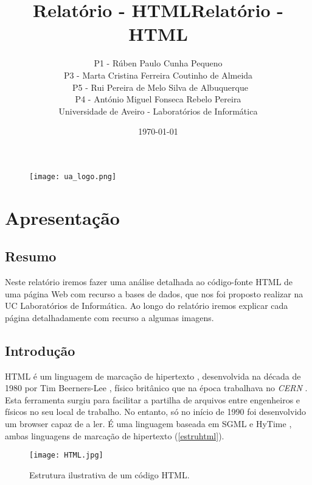 \documentclass[11pt,openright,twoside]{report}
\title{\textbf{Relatório - HTML}}
\begin{document}
\begin{titlepage}
\begin{figure}
\title{\textbf{Relatório - HTML}}
\author{P1 - Rúben Paulo Cunha Pequeno\\
P3 - Marta Cristina Ferreira Coutinho de Almeida\\\
P5 - Rui Pereira de Melo Silva de Albuquerque\\
P4 - António Miguel Fonseca Rebelo Pereira\\\vspace{3cm}
Universidade de Aveiro - Laboratórios de Informática}
\date{\today}
 \texttt{[image: ua\_logo.png]}
\end{figure}
\end{titlepage}

\maketitle
\tableofcontents
\listoffigures

\part{Apresentação}

\chapter{Resumo}
Neste relatório iremos fazer uma análise detalhada ao código-fonte HTML de uma página Web com recurso a bases de dados, que nos foi proposto realizar na UC Laboratórios de Informática. Ao longo do relatório iremos explicar cada página detalhadamente com recurso a algumas imagens.
\smallskip


\chapter{Introdução}
HTML é um linguagem de marcação de hipertexto \cite{markup}, desenvolvida na década de 1980 por Tim Beerners-Lee \cite{HTML}, físico britânico que na época trabalhava no \textit{CERN} \cite{CERN}. Esta ferramenta surgiu para facilitar a partilha de arquivos entre engenheiros e físicos no seu local de trabalho. No entanto, só no início de 1990 foi desenvolvido um browser capaz de a ler. É uma linguagem baseada em SGML \cite{SGML} e HyTime \cite{HyTime}, ambas linguagens de marcação de hipertexto (\autoref{estruhtml}).
\smallskip

\begin{figure}
 \center
 \texttt{[image: HTML.jpg]}
 \caption{Estrutura ilustrativa de um código HTML.}
 \label{estruhtml}
\end{figure}
\end{document}
